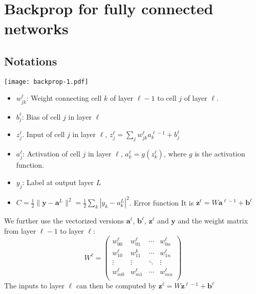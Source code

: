 \documentclass[a4paper,10pt]{article}
\author{Thomas Epp}
\newcommand{\vc}[1]{\boldsymbol{#1}}
\begin{document}
\maketitle

\section{Backprop for fully connected networks}

\def\inn{\text{in}}

\subsection{Notations}

\begin{center}
    \texttt{[image: backprop-1.pdf]}
\end{center}

\begin{itemize}
    \item $w_{jk}^\ell$: Weight connecting cell $k$ of layer $\ell -1$ to cell $j$ of layer $\ell$.
    \item $b_j^\ell$: Bias of cell $j$ in layer $\ell$
    \item $z_j^\ell$. Input of cell $j$ in layer $\ell$, $z_j^\ell = \sum_j w_{jk}^\ell a_k^{\ell-1} + b_j^\ell$
    \item $a_j^\ell$: Activation of cell $j$ in layer $\ell$, $a_k^{\ell} = g(z_k^\ell)$, where $g$ is the activation function.
    \item $y_j$: Label at output layer $L$
    \item $C=\frac12 \| \vc{y} - \vc{a}^L \|^2 = \frac12 \sum_{k} | y_k - a_k^L |^2$. Error function
          It is $\vc{z}^{\ell} = W\vc{a}^{\ell-1} + \vc{b}^\ell$
\end{itemize}

We further use the vectorized versions $\vc{a}^\ell$, $\vc{b}^\ell$,
$\vc{z}^\ell$ and $\vc{y}$ and the weight matrix from layer $\ell-1$ to layer
$\ell$:
\[
    W^\ell =
    \begin{pmatrix}
        w_{00}^\ell & w_{01}^\ell & \cdots & w_{0n}^\ell \\
        w_{10}^\ell & w_{11}^k    & \cdots & w_{1n}^\ell \\
        \vdots      & \vdots      & \ddots & \vdots      \\
        w_{m0}^\ell & w_{m1}^\ell & \cdots & w_{mn}^\ell \\
    \end{pmatrix}
\]
The inputs to layer $\ell$ can then be computed by $\vc{z}^\ell =
    W\vc{z}^{\ell-1}+\vc{b}^\ell$
\end{document}
